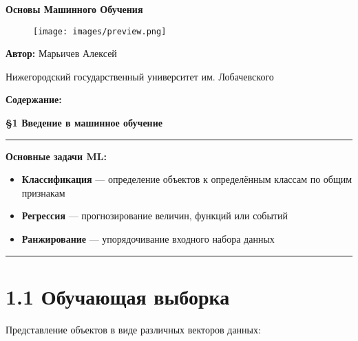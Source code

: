 \documentclass[a4paper,12pt]{article} %
\begin{document}
\begin{titlepage}
    \centering
    \vspace{2cm}

    {\Huge \textbf{Основы Машинного Обучения} \par}
    \vspace{1cm}


    \begin{figure}[htbp]
        \centering
        \texttt{[image: images/preview.png]}
        \label{fig:example}
    \end{figure}
    \vspace{5cm}

    \begin{flushright}
    \textbf{Автор:} Марьичев Алексей \\
    \vspace{3cm}
    \centering
    {\large Нижегородский государственный университет им. Лобачевского\par}
    \end{flushright}

\end{titlepage}

\newpage
    \centering
    {\Huge \textbf{Содержание:}}


\newpage
    \centering
    \textbf{\S 1 Введение в машинное обучение}
    \vspace{1em}
\noindent\rule{\linewidth}{0.4pt}

\vspace{1em}
\textbf{ Основные задачи ML:}
\begin{itemize}
    \item \textbf{Классификация} — определение объектов к определённым классам по общим признакам
    \item \textbf{Регрессия} — прогнозирование величин, функций или событий
    \item \textbf{Ранжирование} — упорядочивание входного набора данных
\end{itemize}

\vspace{1em}
\noindent\rule{\linewidth}{0.4pt}

\section*{1.1 Обучающая выборка}

Представление объектов в виде различных векторов данных:
\end{document}
